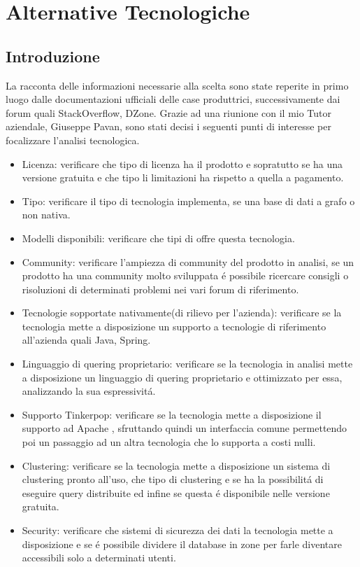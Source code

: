 \section{Alternative Tecnologiche}
\subsection{Introduzione}
La racconta delle informazioni necessarie alla scelta sono state reperite in primo luogo dalle documentazioni ufficiali delle case produttrici, successivamente dai forum quali StackOverflow, DZone.
Grazie ad una riunione con il mio Tutor aziendale, Giuseppe Pavan, sono stati decisi i seguenti punti di interesse per focalizzare l'analisi tecnologica.
\begin{itemize}
\item{Licenza:} verificare che tipo di licenza ha il prodotto e sopratutto se ha una versione gratuita e che tipo li limitazioni ha rispetto a quella a pagamento.
\item{Tipo:} verificare il tipo di tecnologia implementa, se una base di dati a grafo  o non nativa.
\item{Modelli disponibili:} verificare che tipi di  offre questa tecnologia.
\item{Community:} verificare l'ampiezza di community del prodotto in analisi, se un prodotto ha una community molto sviluppata \'e possibile ricercare consigli o risoluzioni di determinati problemi nei vari forum di riferimento.
\item{Tecnologie sopportate nativamente(di rilievo per l'azienda):} verificare se la tecnologia mette a disposizione un supporto a tecnologie di riferimento all'azienda quali Java, Spring.
\item{Linguaggio di quering proprietario:} verificare se la tecnologia in analisi mette a disposizione un linguaggio di quering proprietario e ottimizzato per essa, analizzando la sua espressivit\'a.
\item{Supporto Tinkerpop:} verificare se la tecnologia mette a disposizione il supporto ad Apache , sfruttando quindi un interfaccia comune permettendo poi un passaggio ad un altra tecnologia che lo supporta a costi nulli.
\item{Clustering:} verificare se la tecnologia mette a disposizione un sistema di clustering pronto all'uso, che tipo di clustering e se ha la possibilit\'a di eseguire query distribuite ed infine se questa \'e disponibile nelle versione gratuita.
\item{Security:} verificare che sistemi di sicurezza dei dati la tecnologia mette a disposizione e se \'e possibile dividere il database in zone per farle diventare accessibili solo a determinati utenti.
\end{itemize}
